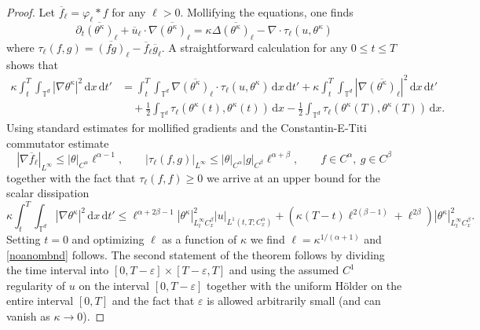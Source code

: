 \documentclass[12pt]{report}   %
\renewcommand{\le}{\leqslant}
\renewcommand{\ge}{\geqslant}
\renewcommand{\epsilon}{\varepsilon}
\numberwithin{equation}{section}
\theoremstyle{plain}
\theoremstyle{definition}
\theoremstyle{remark}
\newcommand{\rmd}{\, \mathrm{d}}
\def\ol{\overline}
\begin{document}
\begin{proof}
Let $\ol{f}_\ell = \varphi_\ell *f$ for any $\ell>0$.  Mollifying the equations, one finds
\begin{equation}
\partial_t \ol{(\theta^\kappa)}_\ell + \ol{u}_\ell \cdot \nabla \ol{(\theta^\kappa)}_\ell = \kappa \Delta \ol{(\theta^\kappa)}_\ell - \nabla \cdot \tau_\ell(u,\theta^\kappa)
\end{equation}
where $\tau_\ell(f,g)= \ol{(fg)}_\ell - \ol{f}_\ell \ol{g}_\ell$.  A straightforward calculation  for any $0\le t\le T$ shows that
\begin{align}\nonumber
 \kappa \int_{t}^T \int_{\mathbb{T}^d} |\nabla \theta^\kappa|^2 \rmd x \rmd t' &= \int_t^T \int_{\mathbb{T}^d} \nabla\ol{(\theta^\kappa)}_\ell\cdot \tau_\ell(u,\theta^\kappa) \rmd x \rmd t' +  \kappa \int_t^T\int_{\mathbb{T}^d} |\nabla \ol{(\theta^\kappa)}_\ell|^2 \rmd x \rmd t' \\
 &\quad + \frac{1}{2} \int_{\mathbb{T}^d}  \tau_\ell(\theta^\kappa(t),\theta^\kappa (t)) \rmd x-  \frac{1}{2} \int_{\mathbb{T}^d}  \tau_\ell(\theta^\kappa(T),\theta^\kappa (T )) \rmd x.
\end{align}
Using standard estimates for mollified gradients and the Constantin-E-Titi \cite{ConstantinEEA94} commutator estimate 
\begin{equation}
|\nabla \ol{f}_\ell|_{L^\infty}\le  |\theta |_{C^\alpha} \ell^{\alpha-1}, \qquad |\tau_\ell (f,g)|_{L^\infty} \le |\theta |_{C^\alpha} |g|_{C^\beta} \ell^{\alpha+\beta}, \qquad f\in C^\alpha, \ g\in C^\beta
\end{equation}
together with the fact that $\tau_\ell(f,f)\ge 0$ we arrive at an upper bound for the scalar dissipation
\begin{equation}
 \kappa \int_{t}^T \int_{\mathbb{T}^d} |\nabla \theta^\kappa|^2 \rmd x \rmd t' \le    \ell^{\alpha+2\beta-1} |\theta^\kappa|_{L^\infty_tC^\beta_x}^2  |u|_{L^1(t,T; C^\alpha_x)}  +  \left(\kappa (T-t) \ell^{2(\beta-1)} + \ell^{2\beta}\right) |\theta^\kappa|_{L^\infty_tC^\beta_x}^2.
\end{equation}
Setting $t=0$ and optimizing $\ell$ as a function of $\kappa$ we find $\ell= \kappa^{1/(\alpha+1)}$ and \eqref{noanombnd} follows.  The second statement of the theorem follows by dividing the time interval  into $[0, T-\epsilon] \times [T-\epsilon, T]$ and using the assumed $C^1$ regularity of $u$ on the interval $[0, T-\epsilon] $ together with the uniform H\"{o}lder on the entire interval $[0,T]$ and the fact that $\epsilon$ is allowed arbitrarily small (and can vanish as $\kappa\to 0$).
\end{proof}
\end{document}
